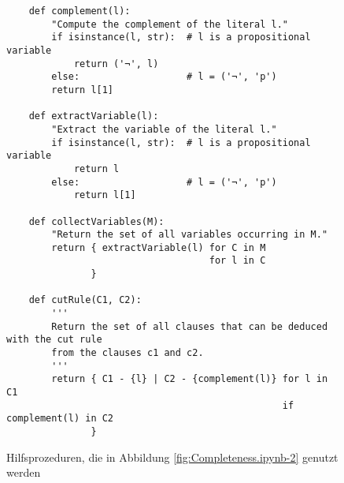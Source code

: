\begin{figure}[!ht]
\centering
\begin{verbatim}
    def complement(l):
        "Compute the complement of the literal l."
        if isinstance(l, str):  # l is a propositional variable
            return ('¬', l)
        else:                   # l = ('¬', 'p')
        return l[1]

    def extractVariable(l):
        "Extract the variable of the literal l."
        if isinstance(l, str):  # l is a propositional variable
            return l
        else:                   # l = ('¬', 'p')
            return l[1]
    
    def collectVariables(M):
        "Return the set of all variables occurring in M."
        return { extractVariable(l) for C in M 
                                    for l in C
               }        
        
    def cutRule(C1, C2):
        '''
        Return the set of all clauses that can be deduced with the cut rule 
        from the clauses c1 and c2.
        '''
        return { C1 - {l} | C2 - {complement(l)} for l in C1
                                                 if  complement(l) in C2
               }
\end{verbatim}
\vspace*{-0.3cm}
\caption{Hilfsprozeduren, die in Abbildung \ref{fig:Completeness.ipynb-2} genutzt werden}
\label{fig:Completeness.ipynb-1}
\end{figure}


